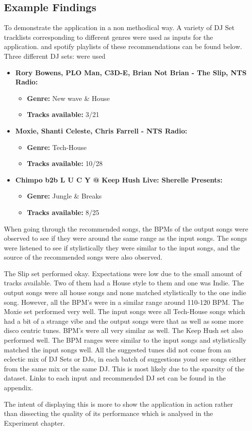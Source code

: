 \subsection{Example Findings}
To demonstrate the application in a non methodical way. A variety of DJ Set tracklists corresponding to different genres were used as inputs for the application. and spotify playlists of these recommendations can be found below.  Three different DJ sets: were used

\begin{itemize}
	\item \textbf{Rory Bowens, PLO Man, C3D-E, Brian Not Brian - The Slip, NTS Radio: } 
	\begin{itemize}
		\item \textbf{Genre:} New wave \& House
		\item \textbf{Tracks available:} 3/21
	\end{itemize}
	\item \textbf{Moxie, Shanti Celeste, Chris Farrell - NTS Radio: } 
	\begin{itemize}
		\item \textbf{Genre:} Tech-House
		\item \textbf{Tracks available:} 10/28
	\end{itemize}
	\item \textbf{Chimpo b2b L U C Y @ Keep Hush Live: Sherelle Presents:}
	\begin{itemize}
		\item \textbf{Genre:} Jungle \& Breaks
		\item \textbf{Tracks available:} 8/25
	\end{itemize}
	
\end{itemize}

When going through the recommended songs, the BPMs of the output songs were observed to see if they were around the same range as the input songs. The songs were listened to see if stylistically they were similar to the input songs, and the source of the recommended songs were also observed.

The Slip set performed okay. Expectations were low due to the small amount of tracks available. Two of them had a House style to them and one was Indie. The output songs were all house songs and none matched stylistically to the one indie song. However, all the BPM's were in a similar range around 110-120 BPM. The Moxie set performed very well. The input songs were all Tech-House songs which had a bit of a strange vibe and the output songs were that as well as some more disco centric tunes. BPM's were all very similar as well. The Keep Hush set also performed well. The BPM ranges were similar to the input songs and stylistically matched the input songs well. All the suggested tunes did not come from an eclectic mix of DJ Sets or DJs, in each batch of suggestions youd see songs either from the same mix or the same DJ. This is most likely due to the sparsity of the dataset. Links to each input and recommended DJ set can be found in the appendix.

The intent of displaying this is more to show the application in action rather than dissecting the quality of its performance which is analysed in the Experiment chapter.

